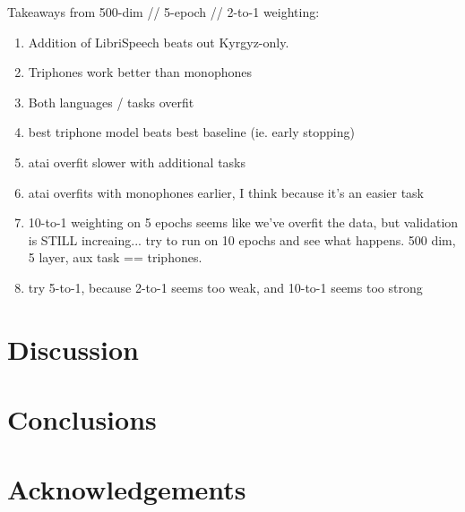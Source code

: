 \documentclass[a4paper]{article}
\begin{document}
Takeaways from 500-dim // 5-epoch // 2-to-1 weighting:

\begin{enumerate}
\item Addition of LibriSpeech beats out Kyrgyz-only.
\item Triphones work better than monophones
\item Both languages / tasks overfit
\item best triphone model beats best baseline (ie. early stopping)
\item atai overfit slower with additional tasks
\item atai overfits with monophones earlier, I think because it's an easier task
\item 10-to-1 weighting on 5 epochs seems like we've overfit the data, but validation is STILL increaing... try to run on 10 epochs and see what happens. 500 dim, 5 layer, aux task == triphones.
\item try 5-to-1, because 2-to-1 seems too weak, and 10-to-1 seems too strong
\end{enumerate}




\section{Discussion}


\section{Conclusions}

\section{Acknowledgements}






\end{document}
